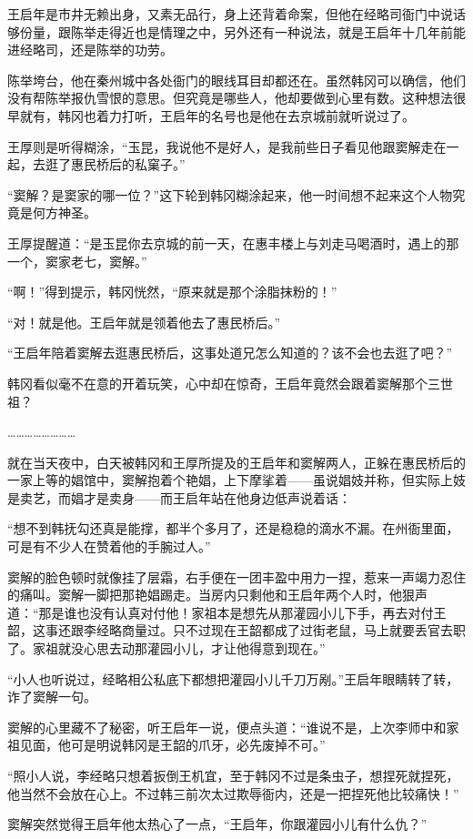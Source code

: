 王启年是市井无赖出身，又素无品行，身上还背着命案，但他在经略司衙门中说话够份量，跟陈举走得近也是情理之中，另外还有一种说法，就是王启年十几年前能进经略司，还是陈举的功劳。

陈举垮台，他在秦州城中各处衙门的眼线耳目却都还在。虽然韩冈可以确信，他们没有帮陈举报仇雪恨的意思。但究竟是哪些人，他却要做到心里有数。这种想法很早就有，韩冈也着力打听，王启年的名号也是他在去京城前就听说过了。

王厚则是听得糊涂，“玉昆，我说他不是好人，是我前些日子看见他跟窦解走在一起，去逛了惠民桥后的私窠子。”

“窦解？是窦家的哪一位？”这下轮到韩冈糊涂起来，他一时间想不起来这个人物究竟是何方神圣。

王厚提醒道：“是玉昆你去京城的前一天，在惠丰楼上与刘走马喝酒时，遇上的那一个，窦家老七，窦解。”

“啊！”得到提示，韩冈恍然，“原来就是那个涂脂抹粉的！”

“对！就是他。王启年就是领着他去了惠民桥后。”

“王启年陪着窦解去逛惠民桥后，这事处道兄怎么知道的？该不会也去逛了吧？”

韩冈看似毫不在意的开着玩笑，心中却在惊奇，王启年竟然会跟着窦解那个三世祖？

……………………

就在当天夜中，白天被韩冈和王厚所提及的王启年和窦解两人，正躲在惠民桥后的一家上等的娼馆中，窦解抱着个艳娼，上下摩挲着——虽说娼妓并称，但实际上妓是卖艺，而娼才是卖身——而王启年站在他身边低声说着话：

“想不到韩抚勾还真是能撑，都半个多月了，还是稳稳的滴水不漏。在州衙里面，可是有不少人在赞着他的手腕过人。”

窦解的脸色顿时就像挂了层霜，右手便在一团丰盈中用力一捏，惹来一声竭力忍住的痛叫。窦解一脚把那艳娼踢走。当房内只剩他和王启年两个人时，他狠声道：“那是谁也没有认真对付他！家祖本是想先从那灌园小儿下手，再去对付王韶，这事还跟李经略商量过。只不过现在王韶都成了过街老鼠，马上就要丢官去职了。家祖就没心思去动那灌园小儿，才让他得意到现在。”

“小人也听说过，经略相公私底下都想把灌园小儿千刀万剐。”王启年眼睛转了转，诈了窦解一句。

窦解的心里藏不了秘密，听王启年一说，便点头道：“谁说不是，上次李师中和家祖见面，他可是明说韩冈是王韶的爪牙，必先废掉不可。”

“照小人说，李经略只想着扳倒王机宜，至于韩冈不过是条虫子，想捏死就捏死，他当然不会放在心上。不过韩三前次太过欺辱衙内，还是一把捏死他比较痛快！”

窦解突然觉得王启年他太热心了一点，“王启年，你跟灌园小儿有什么仇？”

